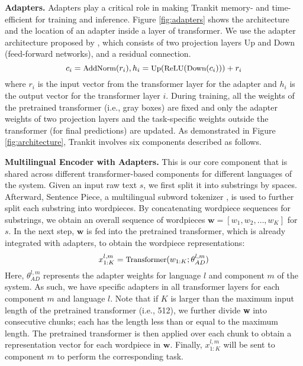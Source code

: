\documentclass[11pt,a4paper]{article}
\begin{document}
\noindent \textbf{Adapters.} Adapters play a critical role in making Trankit memory- and time-efficient for training and inference. Figure \ref{fig:adapters} shows the architecture and the location of an adapter inside a layer of transformer. We use the adapter architecture proposed by \citep{pfeiffer-etal-2020-adapterhub,pfeiffer-etal-2020-mad}, which consists of two projection layers \textrm{Up} and \textrm{Down} (feed-forward networks), and a residual connection.
\begin{equation}
\small
c_i = \textrm{AddNorm}(r_i),  h_i = \textrm{Up}(\textrm{ReLU}(\textrm{Down}(c_i))) + r_i
\end{equation}
where $r_i$ is the input vector from the transformer layer for the adapter and $h_i$ is the output vector for the transformer layer $i$. During training, all the weights of the pretrained transformer (i.e., gray boxes) are fixed and only the adapter weights of two projection layers and the task-specific weights outside the transformer (for final predictions) are updated. As demonstrated in Figure \ref{fig:architecture}, Trankit involves six components described as follows.







\vspace{0.3cm}

\noindent \textbf{Multilingual Encoder with Adapters.} This is our core component that is shared across different transformer-based components for different languages of the system. Given an input raw text $s$, we first split it into substrings by spaces. Afterward, Sentence Piece, a multilingual subword tokenizer \citep{kudo-richardson-2018-sentencepiece,kudo-2018-subword}, is used to further split each substring into wordpieces. By concatenating wordpiece sequences for substrings, we obtain an overall sequence of wordpieces $\textbf{w}= [w_1, w_2, \ldots, w_K]$ for $s$. In the next step, $\textbf{w}$ is fed into the pretrained transformer, which is already integrated with adapters, to obtain the wordpiece representations:
\begin{equation} \label{eq:encoder}
\small
    x^{l,m}_{1:K} = \textrm{Transformer}(w_{1:K}; \theta_{AD}^{l,m})
\end{equation}
Here, $\theta_{AD}^{l,m}$ represents the adapter weights for language $l$ and component $m$ of the system. As such, we have specific adapters in all transformer layers for each component $m$ and language $l$. Note that if $K$ is larger than the maximum input length of the pretrained transformer (i.e., 512), we further divide \textbf{w} into consecutive chunks; each has the length less than or equal to the maximum length. The pretrained transformer is then applied over each chunk to obtain a representation vector for each wordpiece in $\textbf{w}$. Finally, $x^{l,m}_{1:K}$ will be sent to component $m$ to perform the corresponding task.
\end{document}
